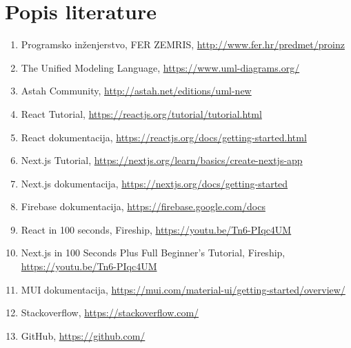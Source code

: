 \chapter*{Popis literature}
	 	
	
		
		
		\begin{enumerate}
			
			
			\item  Programsko inženjerstvo, FER ZEMRIS, \url{http://www.fer.hr/predmet/proinz}

			\item  The Unified Modeling Language, \url{https://www.uml-diagrams.org/}
			
			\item  Astah Community, \url{http://astah.net/editions/uml-new}
			\item React Tutorial, \url{https://reactjs.org/tutorial/tutorial.html}
			\item React dokumentacija, \url{https://reactjs.org/docs/getting-started.html}
			\item Next.js Tutorial,  \url{https://nextjs.org/learn/basics/create-nextjs-app}
			\item Next.js dokumentacija, \url{https://nextjs.org/docs/getting-started}
			\item Firebase dokumentacija, \url{https://firebase.google.com/docs}
			\item React in 100 seconds, Fireship, \url{https://youtu.be/Tn6-PIqc4UM}
			\item Next.js in 100 Seconds  Plus Full Beginner's Tutorial, Fireship, \url{https://youtu.be/Tn6-PIqc4UM}
			\item MUI dokumentacija, \url{https://mui.com/material-ui/getting-started/overview/}
			\item Stackoverflow, \url{https://stackoverflow.com/}
			\item GitHub, \url{https://github.com/}
		\end{enumerate}
		
		 